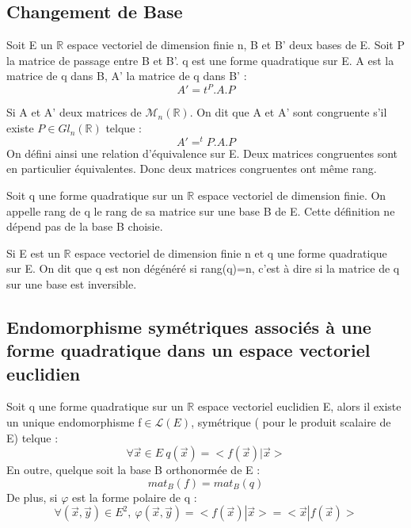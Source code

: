 \subsection{Changement de Base}
Soit E un $\mathbb{R}$ espace vectoriel de dimension finie n, B et B' deux bases de E. Soit P la matrice de passage entre B et B'. q est une forme quadratique sur E. A est la matrice de q dans B, A' la matrice de q dans B' : 
$$A' = t^P.A.P$$
\begin{de}
Si A et A' deux matrices de $\mathcal{M}_n(\mathbb{R})$. On dit que A et A' sont congruente s'il existe $P \in Gl_n(\mathbb{R})$ telque : 
$$A' = ^tP.A.P$$
On défini ainsi une relation d'équivalence sur E. Deux matrices congruentes sont en particulier équivalentes. Donc deux matrices congruentes ont même rang.
\end{de}
\begin{de}
Soit q une forme quadratique sur un $\mathbb{R}$ espace vectoriel de dimension finie. On appelle rang de q le rang de sa matrice sur une base B de E. Cette définition ne dépend pas de la base B choisie.
\end{de}
\begin{de}
Si E est un $\mathbb{R}$ espace vectoriel de dimension finie n et q une forme quadratique sur E. On dit que q est non dégénéré si rang(q)=n, c'est à dire si la matrice de q sur une base est inversible.
\end{de}
\subsection{Endomorphisme symétriques associés à une forme quadratique dans un espace vectoriel euclidien}
\begin{prop}
Soit q une forme quadratique sur un $\mathbb{R}$ espace vectoriel euclidien E, alors il existe un unique endomorphisme f$\in \mathcal{L}(E)$, symétrique ( pour le produit scalaire de E) telque : 
$$\forall \overrightarrow{x} \in E~ q(\overrightarrow{x}) = <f(\overrightarrow{x})|\overrightarrow{x}>$$
En outre, quelque soit la base B orthonormée de E : 
$$mat_B(f) = mat_B(q)$$
De plus, si $\varphi$ est la forme polaire de q :
$$\forall (\overrightarrow{x},\overrightarrow{y})\in E^2,~ \varphi(\overrightarrow{x},\overrightarrow{y}) = <f(\overrightarrow{x}) | \overrightarrow{x}> = <\overrightarrow{x} | f(\overrightarrow{x})>$$
\end{prop}
